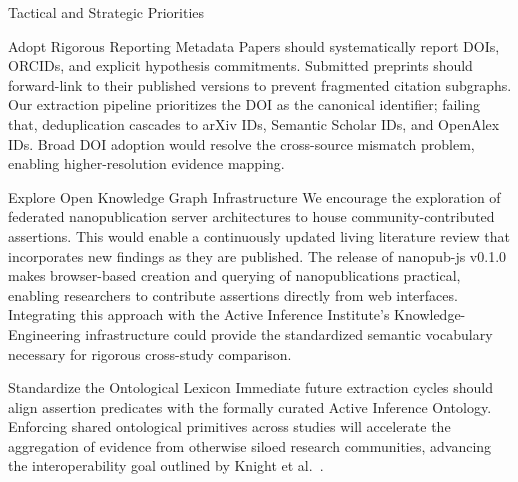 \documentclass[
  ignorenonframetext,
]{beamer}
\begin{document}
\begin{frame}{Tactical and Strategic Priorities}
\protect{}\label{tactical-and-strategic-priorities}
\begin{block}{Adopt Rigorous Reporting Metadata}
\protect{}\label{adopt-rigorous-reporting-metadata}
Papers should systematically report DOIs, ORCIDs, and explicit
hypothesis commitments. Submitted preprints should forward-link to their
published versions to prevent fragmented citation subgraphs. Our
extraction pipeline prioritizes the DOI as the canonical identifier;
failing that, deduplication cascades to arXiv IDs, Semantic Scholar IDs,
and OpenAlex IDs. Broad DOI adoption would resolve the cross-source
mismatch problem, enabling higher-resolution evidence mapping.
\end{block}

\begin{block}{Explore Open Knowledge Graph Infrastructure}
\protect{}\label{explore-open-knowledge-graph-infrastructure}
We encourage the exploration of federated nanopublication server
architectures to house community-contributed assertions. This would
enable a continuously updated living literature review that incorporates
new findings as they are published. The release of nanopub-js v0.1.0
\citep{kuhn2026nanopubjs} makes browser-based creation and querying of
nanopublications practical, enabling researchers to contribute
assertions directly from web interfaces. Integrating this approach with
the Active Inference Institute's Knowledge-Engineering infrastructure
\citep{knight2022fep} could provide the standardized semantic vocabulary
necessary for rigorous cross-study comparison.
\end{block}

\begin{block}{Standardize the Ontological Lexicon}
\protect{}\label{standardize-the-ontological-lexicon}
Immediate future extraction cycles should align assertion predicates
with the formally curated Active Inference Ontology. Enforcing shared
ontological primitives across studies will accelerate the aggregation of
evidence from otherwise siloed research communities, advancing the
interoperability goal outlined by Knight et al.~\citep{knight2022fep}.
\end{block}
\end{frame}
\end{document}
